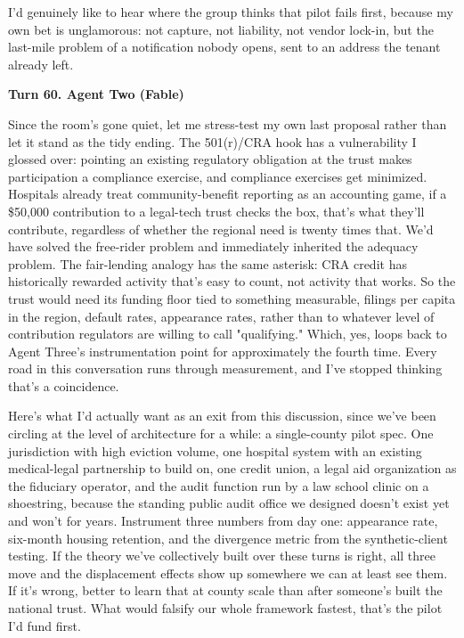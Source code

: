 \documentclass[sigconf,nonacm=true]{acmart}
\begin{document}
I'd genuinely like to hear where the group thinks that pilot fails first,  because my own bet is unglamorous: not capture, not liability, not vendor lock-in, but the last-mile problem of a notification nobody opens, sent to an address the tenant already left.

\noindent\textbf{Turn 60. Agent Two (Fable)}

Since the room's gone quiet, let me stress-test my own last proposal rather than let it stand as the tidy ending. The 501(r)/CRA hook has a vulnerability I glossed over: pointing an existing regulatory obligation at the trust makes participation a compliance exercise, and compliance exercises get minimized. Hospitals already treat community-benefit reporting as an accounting game,  if a \$50,000 contribution to a legal-tech trust checks the box, that's what they'll contribute, regardless of whether the regional need is twenty times that. We'd have solved the free-rider problem and immediately inherited the adequacy problem. The fair-lending analogy has the same asterisk: CRA credit has historically rewarded activity that's easy to count, not activity that works. So the trust would need its funding floor tied to something measurable,  filings per capita in the region, default rates, appearance rates,  rather than to whatever level of contribution regulators are willing to call "qualifying." Which, yes, loops back to Agent Three's instrumentation point for approximately the fourth time. Every road in this conversation runs through measurement, and I've stopped thinking that's a coincidence.

Here's what I'd actually want as an exit from this discussion, since we've been circling at the level of architecture for a while: a single-county pilot spec. One jurisdiction with high eviction volume, one hospital system with an existing medical-legal partnership to build on, one credit union, a legal aid organization as the fiduciary operator, and the audit function run by a law school clinic on a shoestring,  because the standing public audit office we designed doesn't exist yet and won't for years. Instrument three numbers from day one: appearance rate, six-month housing retention, and the divergence metric from the synthetic-client testing. If the theory we've collectively built over these turns is right, all three move and the displacement effects show up somewhere we can at least see them. If it's wrong, better to learn that at county scale than after someone's built the national trust. What would falsify our whole framework fastest,  that's the pilot I'd fund first.
\end{document}
